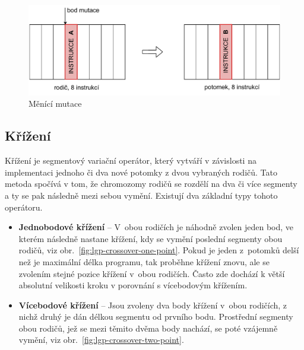 \begin{figure}[!h]
    \centering
    \includegraphics[scale=0.65]{obrazky-figures/lgp-mut-mut.pdf}
    \caption{Měnící mutace}
    \label{fig:lgp-macro-mutation}
\end{figure}


\newpage
\subsection{Křížení}
Křížení je segmentový variační operátor, který vytváří v závislosti na implementaci jednoho či dva nové potomky z dvou vybraných rodičů. Tato metoda spočívá v tom, že chromozomy rodičů se rozdělí na dva či více segmenty a ty  se pak následně mezi sebou vymění. Existují dva základní typy tohoto operátoru.
\begin{itemize}
    \item \textbf{Jednobodové křížení} -- 
    V~obou rodičích je náhodně zvolen jeden bod, ve kterém následně nastane křížení, kdy se vymění poslední segmenty obou rodičů, viz obr.~\ref{fig:lgp-crossover-one-point}. Pokud je jeden z~potomků delší než je maximální délka programu, tak proběhne křížení znovu, ale se zvolením stejné pozice křížení v~obou rodičích. Často zde dochází k větší absolutní velikosti kroku v porovnání s vícebodovým křížením.
    \item \textbf{Vícebodové křížení} -- Jsou zvoleny dva body křížení v~obou rodičích, z nichž druhý je dán délkou segmentu od prvního bodu. Prostřední segmenty obou rodičů, jež se mezi těmito dvěma body nachází, se poté vzájemně vymění, viz obr.~\ref{fig:lgp-crossover-two-point}. 
\end{itemize}

\vspace{0.3cm}


